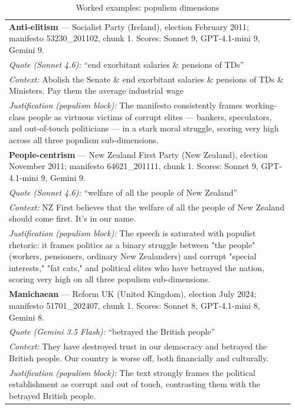 {\footnotesize
\begin{longtable}{p{0.96\linewidth}}
\caption{Worked examples: populism dimensions}\label{tab:oa9a} \\
\toprule
\textbf{Anti-elitism} --- Socialist Party (Ireland), election February 2011; manifesto 53230\_201102, chunk 1. Scores: Sonnet 9, GPT-4.1-mini 9, Gemini 9. \\
\quad \emph{Quote (Sonnet 4.6):} ``end exorbitant salaries \& pensions of TDs'' \\
\quad \emph{Context:} Abolish the Senate \& end exorbitant salaries \& pensions of TDs \& Ministers. Pay them the average industrial wage \\
\quad \emph{Justification (populism block):} The manifesto consistently frames working-class people as virtuous victims of corrupt elites --- bankers, speculators, and out-of-touch politicians --- in a stark moral struggle, scoring very high across all three populism sub-dimensions. \\
\midrule
\textbf{People-centrism} --- New Zealand First Party (New Zealand), election November 2011; manifesto 64621\_201111, chunk 1. Scores: Sonnet 9, GPT-4.1-mini 9, Gemini 9. \\
\quad \emph{Quote (Sonnet 4.6):} ``welfare of all the people of New Zealand'' \\
\quad \emph{Context:} NZ First believes that the welfare of all the people of New Zealand should come first. It's in our name. \\
\quad \emph{Justification (populism block):} The speech is saturated with populist rhetoric: it frames politics as a binary struggle between "the people" (workers, pensioners, ordinary New Zealanders) and corrupt "special interests," "fat cats," and political elites who have betrayed the nation, scoring very high on all three populism sub-dimensions. \\
\midrule
\textbf{Manichaean} --- Reform UK (United Kingdom), election July 2024; manifesto 51701\_202407, chunk 1. Scores: Sonnet 8, GPT-4.1-mini 8, Gemini 8. \\
\quad \emph{Quote (Gemini 3.5 Flash):} ``betrayed the British people'' \\
\quad \emph{Context:} They have destroyed trust in our democracy and betrayed the British people. Our country is worse off, both financially and culturally. \\
\quad \emph{Justification (populism block):} The text strongly frames the political establishment as corrupt and out of touch, contrasting them with the betrayed British people. \\

\end{longtable}}
